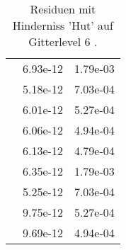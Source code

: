 \begin{table}
\begin{tabular}{c|cc|}
\multicolumn{1}{|c|}{} & \multicolumn{1}{|c|}{  6.93e-12} & \multicolumn{1}{|c|}{  1.79e-03} \\ 
\multicolumn{1}{|c|}{} & \multicolumn{1}{|c|}{  5.18e-12} & \multicolumn{1}{|c|}{  7.03e-04} \\ 
\multicolumn{1}{|c|}{} & \multicolumn{1}{|c|}{  6.01e-12} & \multicolumn{1}{|c|}{  5.27e-04} \\ 
\multicolumn{1}{|c|}{} & \multicolumn{1}{|c|}{  6.06e-12} & \multicolumn{1}{|c|}{  4.94e-04} \\ 
\multicolumn{1}{|c|}{} & \multicolumn{1}{|c|}{  6.13e-12} & \multicolumn{1}{|c|}{  4.79e-04} \\ 
\multicolumn{1}{|c|}{} & \multicolumn{1}{|c|}{  6.35e-12} & \multicolumn{1}{|c|}{  1.79e-03} \\ 
\multicolumn{1}{|c|}{} & \multicolumn{1}{|c|}{  5.25e-12} & \multicolumn{1}{|c|}{  7.03e-04} \\ 
\multicolumn{1}{|c|}{} & \multicolumn{1}{|c|}{  9.75e-12} & \multicolumn{1}{|c|}{  5.27e-04} \\ 
\multicolumn{1}{|c|}{} & \multicolumn{1}{|c|}{  9.69e-12} & \multicolumn{1}{|c|}{  4.94e-04} \\ 
\hline 
\end{tabular}\caption{Residuen mit Hinderniss 'Hut' auf Gitterlevel 6 .}\label{tab:Residuum_Hut_level6}
\end{table} 
